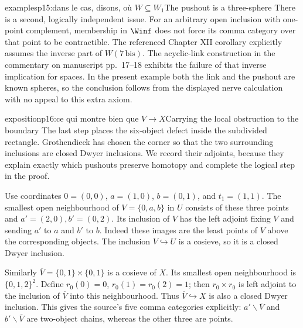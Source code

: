 \begin{dcomment}{examples}{p15:dans le cas, disons, où $W \subseteq W_1$}{The pushout is a three-sphere}
There is a second, logically independent issue. For an arbitrary open inclusion with one-point complement, membership in $\Winf$ does not force its comma category over that point to be contractible. The referenced Chapter XII corollary explicitly assumes the inverse part of $W(7\,\mathrm{bis})$. The acyclic-link construction in the commentary on manuscript pp.~17--18 exhibits the failure of that inverse implication for spaces. In the present example both the link and the pushout are known spheres, so the conclusion follows from the displayed nerve calculation with no appeal to this extra axiom.
\end{dcomment}

\begin{dcomment}{exposition}{p16:ce qui montre bien que $V \longrightarrow X$}{Carrying the local obstruction to the boundary}
The last step places the six-object defect inside the subdivided rectangle. Grothendieck has chosen the corner so that the two surrounding inclusions are closed Dwyer inclusions. We record their adjoints, because they explain exactly which pushouts preserve homotopy and complete the logical step in the proof.

Use coordinates $0=(0,0)$, $a=(1,0)$, $b=(0,1)$, and $t_1=(1,1)$. The smallest open neighbourhood of $V=\{0,a,b\}$ in $U$ consists of these three points and $a'=(2,0), b'=(0,2)$. Its inclusion of $V$ has the left adjoint fixing $V$ and sending $a'$ to $a$ and $b'$ to $b$. Indeed these images are the least points of $V$ above the corresponding objects. The inclusion $V\hookrightarrow U$ is a cosieve, so it is a closed Dwyer inclusion.

Similarly $\overline V=\{0,1\}\times\{0,1\}$ is a cosieve of $X$. Its smallest open neighbourhood is $\{0,1,2\}^2$. Define $r_0(0)=0$, $r_0(1)=r_0(2)=1$; then $r_0\times r_0$ is left adjoint to the inclusion of $\overline V$ into this neighbourhood. Thus $\overline V\hookrightarrow X$ is also a closed Dwyer inclusion. This gives the source's five comma categories explicitly: $a'\backslash\overline V$ and $b'\backslash\overline V$ are two-object chains, whereas the other three are points.


\end{dcomment}
